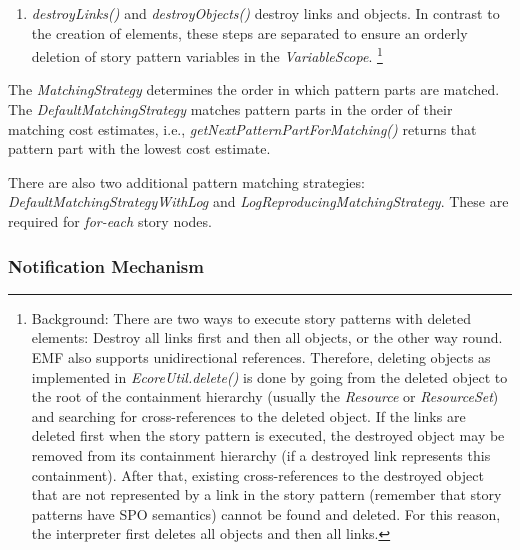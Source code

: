 \begin{enumerate}
	\item \emph{destroyLinks()} and \emph{destroyObjects()} destroy links and objects. 
	In contrast to the creation of elements, these steps are separated to ensure an orderly deletion of story pattern variables in the \emph{VariableScope}.
	\footnote{Background: There are two ways to execute story patterns with deleted elements: Destroy all links first and then all objects, or the other way round. 
	EMF also supports unidirectional references. 
	Therefore, deleting objects as implemented in \emph{EcoreUtil.delete()} is done by going from the deleted object to the root of the containment hierarchy (usually the \emph{Resource} or \emph{ResourceSet}) and searching for cross-references to the deleted object. 
	If the links are deleted first when the story pattern is executed, the destroyed object may be removed from its containment hierarchy (if a destroyed link represents this containment). 
	After that, existing cross-references to the destroyed object that are not represented by a link in the story pattern (remember that story patterns have SPO semantics) cannot be found and deleted. 
	For this reason, the interpreter first deletes all objects and then all links.}
	

\end{enumerate}


The \emph{MatchingStrategy} determines the order in which pattern parts are matched. 
The \emph{DefaultMatchingStrategy} matches pattern parts in the order of their matching cost estimates, i.e., \emph{getNextPatternPartForMatching()} returns that pattern part with the lowest cost estimate. 

There are also two additional pattern matching strategies: \emph{DefaultMatchingStrategyWithLog} and \emph{LogReproducingMatchingStrategy}. 
These are required for \emph{for-each} story nodes. 

\subsubsection{Notification Mechanism}
\label{sec:notification_mechanism}

